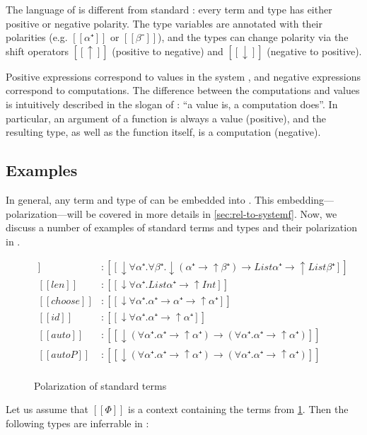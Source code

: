 
The language of \fexists is different from standard \systemf:
every term and type has either positive or negative polarity.
The type variables are annotated with their polarities
(e.g. $[[α⁺]]$ or $[[β⁻]]$), and the types can change polarity
via the shift operators $[[↑]]$ (positive to negative) and
$[[↓]]$ (negative to positive).

Positive expressions correspond to values in the \CBPV system
\cite{levy2006:cbpv}, and negative expressions correspond to computations.
The difference between the computations and values is intuitively described 
in the slogan of \CBPV: ``a value is, a computation does''. 
In particular, an argument of a function is always a value (\ie positive), 
and the resulting type, as well as the function itself, 
is a computation (\ie negative).

\subsection{Examples}

In general, any term and type of \systemf can be embedded into \fexists.
This embedding---polarization---will be covered in more details in \cref{sec:rel-to-systemf}.
Now, we discuss a number of examples of standard \systemf terms and types
and their polarization in \fexists.

\begin{figure}[h]
  \begin{align*}
    [[map]] &: [[↓∀α⁺.∀β⁺.↓(α⁺ → ↑β⁺) → List α⁺ → ↑List β⁺]] \\
    [[len]] &: [[↓∀α⁺.List α⁺ → ↑Int]] \\
    [[choose]] &: [[↓∀α⁺.α⁺ → α⁺ → ↑α⁺]] \\
    [[id]] &: [[↓∀α⁺.α⁺ → ↑α⁺]] \\
    [[auto]] &: [[↓(∀α⁺.α⁺ → ↑α⁺) → (∀α⁺.α⁺ → ↑α⁺)]]\\
    [[autoP]] &: [[↓(∀α⁺.α⁺ → ↑α⁺) → (∀α⁺.α⁺ → ↑α⁺)]]\\
  \end{align*}
  \caption{Polarization of standard \systemf terms}
  \label{fig:polarization-examples}
\end{figure}

Let us assume that $[[Φ]]$ is a context containing the terms from \cref{fig:polarization-examples}.
Then the following types are inferrable in \fexists:

